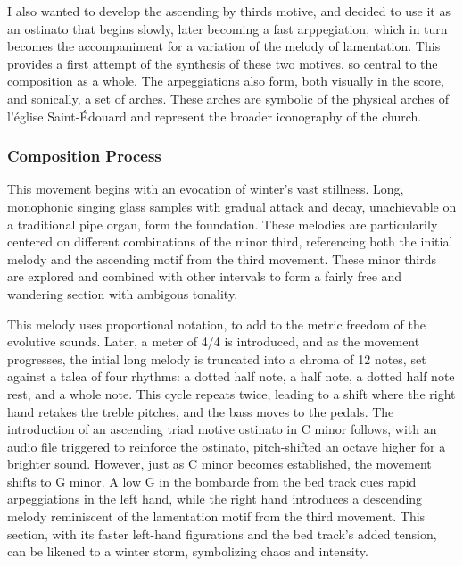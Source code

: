 \documentclass[12pt,twoside,maitrise]{dms}
\theoremstyle{definition}
\begin{document}
I also wanted to develop the ascending by thirds motive, and decided to use it as an ostinato that begins slowly, later becoming a fast arppegiation, which in turn becomes the accompaniment for a variation of the melody of lamentation.
This provides a first attempt of the synthesis of these two motives, so central to the composition as a whole.
The arpeggiations also form, both visually in the score, and sonically, a set of arches.
These arches are symbolic of the physical arches of l'église Saint-Édouard and represent the broader iconography of the church.

\subsubsection{Composition Process}

This movement begins with an evocation of winter's vast stillness.
Long, monophonic singing glass samples with gradual attack and decay, unachievable on a traditional pipe organ, form the foundation.
These melodies are particularily centered on different combinations of the minor third, referencing both the initial melody and the ascending motif from the third movement.
These minor thirds are explored and combined with other intervals to form a fairly free and wandering section with ambigous tonality.


This melody uses proportional notation, to add to the metric freedom of the evolutive sounds. Later, a meter of 4/4 is introduced, and as the movement progresses, the intial long melody is truncated into a chroma of 12 notes, set against a talea of four rhythms: a dotted half note, a half note, a dotted half note rest, and a whole note.
This cycle repeats twice, leading to a shift where the right hand retakes the treble pitches, and the bass moves to the pedals.
The introduction of an ascending triad motive ostinato in C minor follows, with an audio file triggered to reinforce the ostinato, pitch-shifted an octave higher for a brighter sound.
However, just as C minor becomes established, the movement shifts to G minor.
A low G in the bombarde from the bed track cues rapid arpeggiations in the left hand, while the right hand introduces a descending melody reminiscent of the lamentation motif from the third movement.
This section, with its faster left-hand figurations and the bed track's added tension, can be likened to a winter storm, symbolizing chaos and intensity.
\end{document}
